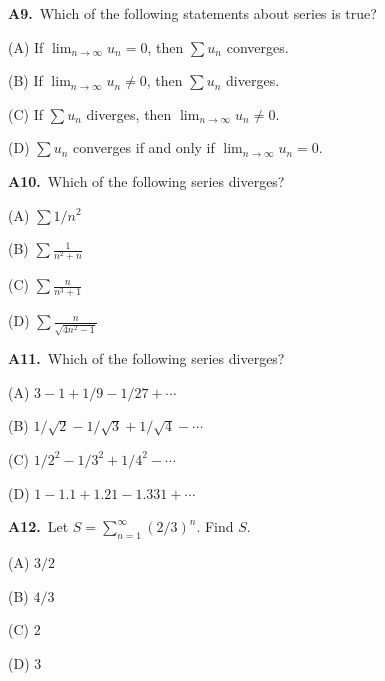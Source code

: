 \documentclass[11pt]{article}
\begin{document}
\bigskip\noindent\textbf{A9.}\ Which of the following statements about series is true?
\begin{list}{}{\setlength{\leftmargin}{3em}\setlength{\labelwidth}{2.5em}\setlength{\itemsep}{0pt}\setlength{\topsep}{2pt}}
\item[(A)] If $\displaystyle\lim_{n\to\infty} u_n=0$, then $\displaystyle\sum u_n$ converges.
\item[(B)] If $\displaystyle\lim_{n\to\infty} u_n\neq 0$, then $\displaystyle\sum u_n$ diverges.
\item[(C)] If $\displaystyle\sum u_n$ diverges, then $\displaystyle\lim_{n\to\infty} u_n\neq 0$.
\item[(D)] $\displaystyle\sum u_n$ converges if and only if $\displaystyle\lim_{n\to\infty} u_n=0$.
\end{list}

\bigskip\noindent\textbf{A10.}\ Which of the following series diverges?
\begin{list}{}{\setlength{\leftmargin}{3em}\setlength{\labelwidth}{2.5em}\setlength{\itemsep}{0pt}\setlength{\topsep}{2pt}}
\item[(A)] $\sum1/n^2$
\item[(B)] $\sum\frac1{n^2+n}$
\item[(C)] $\sum\frac n{n^3+1}$
\item[(D)] $\sum\frac n{\sqrt{4n^2-1}}$
\end{list}

\bigskip\noindent\textbf{A11.}\ Which of the following series diverges?
\begin{list}{}{\setlength{\leftmargin}{3em}\setlength{\labelwidth}{2.5em}\setlength{\itemsep}{0pt}\setlength{\topsep}{2pt}}
\item[(A)] $3-1+1/9-1/27+\cdots$
\item[(B)] $1/\sqrt2-1/\sqrt3+1/\sqrt4-\cdots$
\item[(C)] $1/2^2-1/3^2+1/4^2-\cdots$
\item[(D)] $1-1.1+1.21-1.331+\cdots$
\end{list}

\bigskip\noindent\textbf{A12.}\ Let $S=\sum_{n=1}^\infty(2/3)^n$. Find $S$.
\begin{list}{}{\setlength{\leftmargin}{3em}\setlength{\labelwidth}{2.5em}\setlength{\itemsep}{0pt}\setlength{\topsep}{2pt}}
\item[(A)] $3/2$
\item[(B)] $4/3$
\item[(C)] $2$
\item[(D)] $3$
\end{list}
\end{document}
